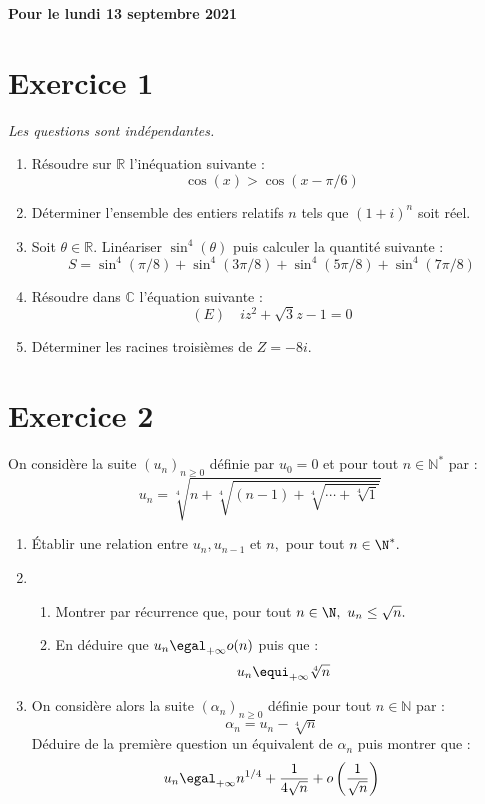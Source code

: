\documentclass[a4paper,french,11pt,twoside]{VcCours}
\begin{document}
\begin{center}
\large\bf 
Pour le lundi 13 septembre 2021
\end{center}
\separationTitre


\section*{Exercice 1}

\emph{Les questions sont indépendantes.}

\begin{enumerate}
\item Résoudre sur $\mathbb{R}$ l'inéquation suivante :
$$ \cos(x) > \cos(x-\pi/6)$$
\item Déterminer l'ensemble des entiers relatifs $n$ tels que $(1+i)^n$ 
soit réel.
\item Soit $\theta \in \mathbb{R}$. Linéariser $\sin^4(\theta)$ puis calculer 
la quantité suivante :
$$ S = \sin^4(\pi/8)+ \sin^4(3\pi/8) + \sin^4(5\pi/8) + \sin^4(7\pi/8)$$
\item Résoudre dans $\mathbb{C}$ l'équation suivante :
$$ (E) \quad i z^2+ \sqrt{3}z-1=0$$
\item Déterminer les racines troisièmes de $Z=-8i$.
\end{enumerate}


\section*{Exercice 2}
On considère la suite $(u_n)_{n \geq 0}$ définie par $u_0=0$ et pour tout 
$n \in \mathbb{N}^*$ par :
$$ u_n=\sqrt[4]{n+\sqrt[4]{(n-1)+\sqrt[4]{\cdots+\sqrt[4]{1}}}}$$

\begin{enumerate}
\item Établir une relation entre $u_n, u_{n-1}$ et $n,$ pour tout
$n\in\N^*.$
\item\begin{enumerate}
\item Montrer par récurrence que, pour tout $n\in\N, \ u_n\leq
\sqrt{n}.$
\item En déduire que $u_n\egal_{+\infty}o(n)$ puis que : 
$$u_n \equi_{+\infty}\sqrt[4]{n}$$
\end{enumerate}
\item On considère alors la suite $(\alpha_n)_{n \geq 0}$
définie pour tout $n \in \mathbb{N}$ par :
$$ \alpha_n=u_n-\sqrt[4]{n}$$
Déduire de la première question un équivalent de $\alpha_n$ puis montrer que :
$$u_n \egal_{+\infty}n^{1/4}+\frac{1}{4\sqrt{n}}+o\left(\frac{1}{\sqrt{n}}\right) $$
\end{enumerate}
\end{document}
